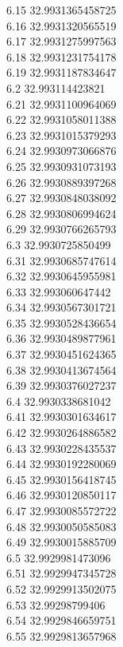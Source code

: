 {6.15	32.9931365458725\\
6.16	32.9931320565519\\
6.17	32.9931275997563\\
6.18	32.9931231754178\\
6.19	32.9931187834647\\
6.2	32.993114423821\\
6.21	32.9931100964069\\
6.22	32.9931058011388\\
6.23	32.9931015379293\\
6.24	32.9930973066876\\
6.25	32.9930931073193\\
6.26	32.9930889397268\\
6.27	32.9930848038092\\
6.28	32.9930806994624\\
6.29	32.9930766265793\\
6.3	32.9930725850499\\
6.31	32.9930685747614\\
6.32	32.9930645955981\\
6.33	32.993060647442\\
6.34	32.9930567301721\\
6.35	32.9930528436654\\
6.36	32.9930489877961\\
6.37	32.9930451624365\\
6.38	32.9930413674564\\
6.39	32.9930376027237\\
6.4	32.9930338681042\\
6.41	32.9930301634617\\
6.42	32.9930264886582\\
6.43	32.9930228435537\\
6.44	32.9930192280069\\
6.45	32.9930156418745\\
6.46	32.9930120850117\\
6.47	32.9930085572722\\
6.48	32.9930050585083\\
6.49	32.9930015885709\\
6.5	32.9929981473096\\
6.51	32.9929947345728\\
6.52	32.9929913502075\\
6.53	32.99298799406\\
6.54	32.9929846659751\\
6.55	32.9929813657968\\
}
